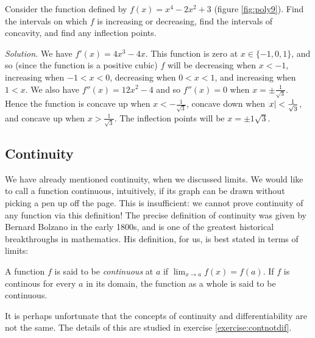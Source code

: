 \begin{ex}
  Consider the function defined by $ f(x) = x^4 - 2x^2 + 3 $ (figure \ref{fig:poly9}). Find the intervals on which $ f $
  is increasing or decreasing, find the intervals of concavity, and find any inflection points.

  \textit{Solution.} We have $ f'(x) = 4x^3 - 4x $. This function is zero at $ x \in \{-1, 0, 1\} $, and so (since the function
  is a positive cubic) $ f $ will be decreasing when $ x < -1 $, increasing when $ -1 < x < 0 $, decreasing when $ 0 < x < 1 $,
  and increasing when $ 1 < x $. We also have $ f''(x) = 12x^2 - 4 $ and so $ f''(x) = 0 $ when $ x = \pm \frac{1}{\sqrt{3}} $.
  Hence the function is concave up when $ x < -\frac{1}{\sqrt{3}} $, concave down when $ \abs{x} < \frac{1}{\sqrt{3}} $, and concave
  up when $ x > \frac{1}{\sqrt{3}} $. The inflection points will be $ x = \pm{1}{\sqrt{3}} $.
\end{ex}

\subsection{Continuity}
We have already mentioned continuity, when we discussed limits. We would like to call a
function continuous, intuitively, if its graph can be drawn without picking a pen up off
the page. This is insufficient: we cannot prove continuity of any function via this
definition! The precise definition of continuity was given by Bernard Bolzano in the early
1800s, and is one of the greatest historical breakthroughs in mathematics. His definition,
for us, is best stated in terms of limits:
\begin{defn}
  A function $ f $ is said to be \emph{continuous} at $ a $ if $ \lim_{x \to a} f(x) = f(a) $. If $ f $
  is continous for every $ a $ in its domain, the function as a whole is said to be continuous.
\end{defn}

It is perhaps unfortunate that the concepts of continuity and differentiability are not the same. The details of this
are studied in exercise \ref{exercise:contnotdif}.

